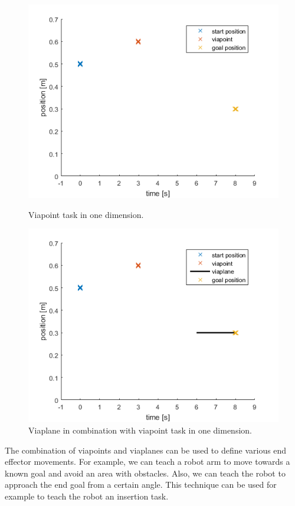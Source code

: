 \documentclass[mscThesis.tex]{subfiles}
\begin{document}
\begin{figure}[!htb]
    \centering
    \begin{minipage}{.5\textwidth}
        \centering
        \includegraphics[width=0.8\linewidth, keepaspectratio]{figures/example-viapoint}
        \caption{Viapoint task in one dimension.}
        \label{fig:viapoint-example}
    \end{minipage}%
    \begin{minipage}{0.5\textwidth}
        \centering
        \includegraphics[width=0.8\linewidth, keepaspectratio]{figures/example-viaplane}
        \caption{Viaplane in combination with viapoint task in one dimension.}
        \label{fig:viaplane-example}
    \end{minipage}
\end{figure}

The combination of viapoints and viaplanes can be used to define various end effector movements. For example, we can teach a robot arm to move towards a known goal and avoid an area with obstacles. Also, we can teach the robot to approach the end goal from a certain angle. This technique can be used for example to teach the robot an insertion task.
\end{document}
